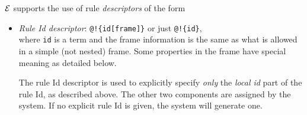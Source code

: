 \documentclass[11pt]{article}
\newcommand{\ERGO}{\mbox{\ensuremath{\cal{E}}\smaller{{\sc{RGO}}}}\xspace}
\newcommand{\FLSYSTEM}{\ERGO}
\begin{document}
\noindent
\FLSYSTEM supports the use of rule \emph{descriptors} of the form
\begin{itemize}
\item  \emph{Rule Id descriptor}:   \texttt{@!\{id[frame]\}}  or just \texttt{@!\{id\}}, \\
  where \texttt{id} is a term and the frame information is the same as what
  is allowed in a simple (not nested) frame.
  Some properties in the frame have special meaning as detailed below.

  The rule Id descriptor is used to explicitly specify \emph{only}
  the \emph{local id}
  part of the rule Id, as described above. The other two components
  are assigned by the system. If no explicit rule Id is given, the system
  will generate one.


\end{itemize}
\end{document}
